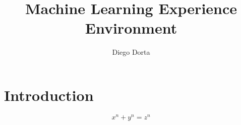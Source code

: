 \documentclass[8pt,letterpaper]{article}
\title{\textbf{Machine Learning Experience Environment}}
\author{Diego Dorta}
\begin{document}
\maketitle

\section{Introduction}
\[ x^n + y^n = z^n \]
\end{document}
